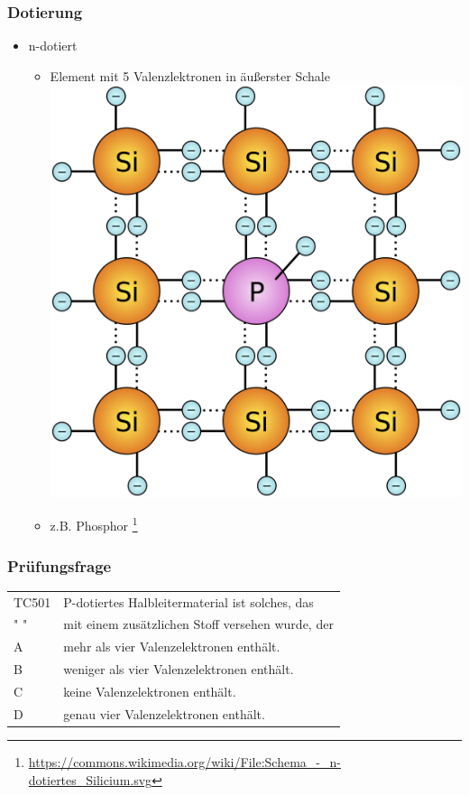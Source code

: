 \begin{frame}
    \frametitle{Dotierung}
      	\begin{itemize}
			\item n-dotiert
      		\begin{itemize}
				\item Element mit 5 Valenzlektronen in äußerster Schale
				 \includegraphics[width=.65\textwidth]{e12/n-dot}
				 \item z.B. Phosphor
        \footnote{\tiny \url{https://commons.wikimedia.org/wiki/File:Schema_-_n-dotiertes_Silicium.svg}}
    	\end{itemize}
    \end{itemize}
\end{frame}


\begin{frame}
    \frametitle{Prüfungsfrage}

    \begin{center}
    \begin{tabular}{l||l}\hline
        TC501 &P-dotiertes Halbleitermaterial ist solches, das \\
         " "  &mit einem zusätzlichen Stoff versehen wurde, der \\ \hline\hline
         A & mehr als vier Valenzelektronen enthält.\\\hline
         B & weniger als vier Valenzelektronen enthält. \\\hline
         C & keine Valenzelektronen enthält. \\ \hline
         D & genau vier Valenzelektronen enthält.\\\hline
    \end{tabular}
 	\end{center}
\end{frame}

